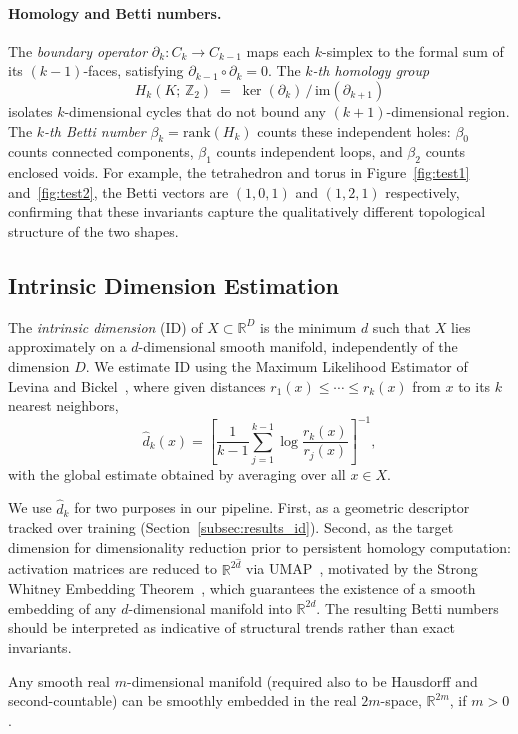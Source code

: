 \paragraph{Homology and Betti numbers.}
The \emph{boundary operator} $\partial_k : C_k \to C_{k-1}$ maps each
$k$-simplex to the formal sum of its $(k-1)$-faces, satisfying
$\partial_{k-1} \circ \partial_k = 0$. The \emph{$k$-th homology group}
\begin{equation}
    H_k(K;\,\mathbb{Z}_2) \;=\; \ker(\partial_k)\,/\,\mathrm{im}(\partial_{k+1})
\end{equation}
isolates $k$-dimensional cycles that do not bound any $(k+1)$-dimensional
region. The \emph{$k$-th Betti number} $\beta_k = \mathrm{rank}(H_k)$
counts these independent holes: $\beta_0$ counts connected components,
$\beta_1$ counts independent loops, and $\beta_2$ counts enclosed voids.
For example, the tetrahedron and torus in Figure~\ref{fig:test1} and~\ref{fig:test2},
the Betti vectors are $(1,0,1)$ and $(1,2,1)$ respectively, confirming that these invariants capture the qualitatively different topological
structure of the two shapes. 


\subsection{Intrinsic Dimension Estimation}
\label{subsec:id}

The \emph{intrinsic dimension} (ID) of $X \subset \mathbb{R}^D$ is the
minimum $d$ such that $X$ lies approximately on a $d$-dimensional smooth
manifold, independently of the dimension $D$. We estimate ID using the Maximum Likelihood Estimator of Levina and
Bickel~\cite{LevinaBickel}, where given distances $r_1(x) \leq \cdots
\leq r_k(x)$ from $x$ to its $k$ nearest neighbors,
\begin{equation}
    \hat{d}_k(x) = \left[
        \frac{1}{k-1} \sum_{j=1}^{k-1}
        \log \frac{r_k(x)}{r_j(x)}
    \right]^{-1},
    \label{eq:mle_id}
\end{equation}
with the global estimate obtained by averaging over all $x \in X$. 

We use $\hat{d}_k$ for two purposes in our pipeline. First, as a geometric descriptor tracked over training (Section~\ref{subsec:results_id}). Second, as the target dimension for dimensionality reduction prior to persistent homology computation: activation matrices are reduced to $\mathbb{R}^{2\hat{d}}$ via UMAP~\cite{McInnes2018}, motivated by the Strong Whitney Embedding Theorem~\cite{whitney1944self}, which guarantees the existence of a smooth embedding of any $d$-dimensional manifold into $\mathbb{R}^{2d}$. The resulting Betti numbers should be interpreted as indicative of structural trends rather than exact invariants. %

\begin{theorem}
    Any smooth real $m$-dimensional manifold (required also to be Hausdorff and second-countable) can be smoothly embedded in the real $2m$-space, $\mathbb{R}^{2m}$, if $m > 0$. 
\end{theorem}
